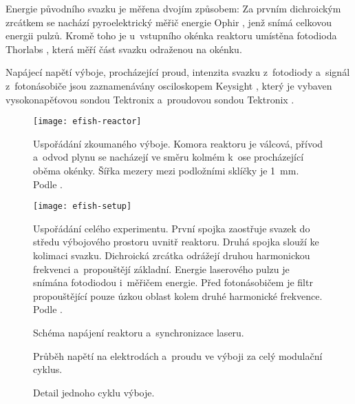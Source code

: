 Energie původního svazku je měřena dvojím způsobem:
Za prvním dichroickým zrcátkem se nachází pyroelektrický měřič energie
Ophir , jenž snímá celkovou energii pulzů.
Kromě toho je u~vstupního okénka reaktoru umístěna fotodioda
Thorlabs , která měří část svazku odraženou na okénku.

Napájecí napětí výboje, procházející proud, intenzita svazku z~fotodiody
a~signál \EFISH{} z~fotonásobiče jsou zaznamenávány osciloskopem
Keysight ,
který je vybaven vysokonapěťovou sondou Tektronix 
a~proudovou sondou Tektronix .

\begin{figure}
	\texttt{[image: efish-reactor]}
	\caption{Uspořádání zkoumaného výboje.
		Komora reaktoru je válcová, přívod a~odvod plynu se nacházejí
		ve směru kolmém k~ose procházející oběma okénky.
		Šířka mezery mezi podložními sklíčky je \SI{1}{\milli\metre}.
		Podle \cite{efish-nitrogen}.}
	\label{fig:efish-reactor}
\end{figure}

\begin{figure}
	\texttt{[image: efish-setup]}
	\caption{Uspořádání celého experimentu.
	První spojka zaostřuje svazek do středu výbojového prostoru
	uvnitř reaktoru.
	Druhá spojka slouží ke kolimaci svazku.
	Dichroická zrcátka odrážejí druhou harmonickou frekvenci
	a~propouštějí základní.
	Energie laserového pulzu je snímána fotodiodou i~měřičem energie.
	Před fotonásobičem je filtr propouštějící pouze úzkou oblast
	kolem druhé harmonické frekvence.
	Podle \cite{efish-nitrogen}.}
	\label{fig:efish-setup}
\end{figure}

\begin{figure}[htp]
	\centering
	\begin{circuitikz}[scale=1.0]
		
	\end{circuitikz}
	\caption{Schéma napájení reaktoru a~synchronizace laseru.}
	\label{fig:efish-circuit}
\end{figure}

\begin{figure}[htp]
	\centering
	
	\caption{Průběh napětí na elektrodách a~proudu ve výboji
		za celý modulační cyklus.}
	\label{fig:efish-overview-full}
	\vspace{24pt}
	
	\caption{Detail jednoho cyklu výboje.}
	\label{fig:efish-overview-period}
\end{figure}

